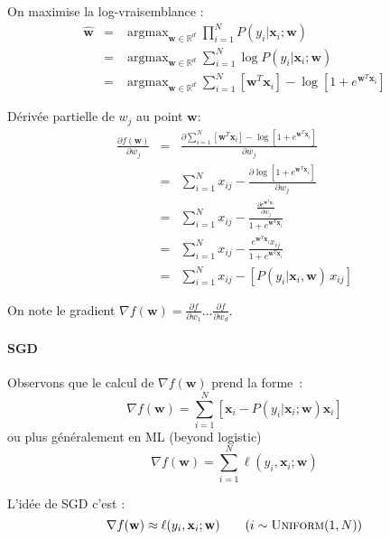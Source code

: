 \documentclass[11pt,openany]{book}
\begin{document}
On maximise la log-vraisemblance :
\begin{eqnarray}
\hat{\mathbf{w}} &=& \mathop{\text{argmax}}_{\mathbf{w} \in
  \mathbb{R}^d} \prod_{i=1}^N P(y_i|\mathbf{x}_i; \mathbf{w})\\
&=&\mathop{\text{argmax}}_{\mathbf{w} \in  \mathbb{R}^d} \sum_{i=1}^N
\log P(y_i|\mathbf{x}_i; \mathbf{w})\\
&=&\mathop{\text{argmax}}_{\mathbf{w} \in  \mathbb{R}^d} \sum_{i=1}^N
 [ \mathbf{w}^T \mathbf{x}_i ] - \log [ 1+e^{\mathbf{w}^T
  \mathbf{x}_i} ]
\end{eqnarray}

Dérivée partielle de $w_j$ au point $\mathbf{w}$:
\begin{eqnarray}
\frac{\partial f(\mathbf{w})}{\partial w_j}&=&\frac{\partial \sum_{i=1}^N
 [ \mathbf{w}^T \mathbf{x}_i ] - \log [ 1+e^{\mathbf{w}^T
  \mathbf{x}_i} ]}{\partial w_j}\\
&=&\sum_{i=1}^N x_{ij} - \frac{\partial \log [ 1+e^{\mathbf{w}^T
  \mathbf{x}_i} ] }{\partial w_j}\\
&=&\sum_{i=1}^N x_{ij} - 
\frac{\frac{\partial e^{\mathbf{w}^T  \mathbf{x}_i} }{\partial
    w_j}}{1+ e^{\mathbf{w}^T  \mathbf{x}_i}}\\
&=&\sum_{i=1}^N x_{ij} - 
\frac{e^{\mathbf{w}^T  \mathbf{x}_i} x_{ij}} {1+ e^{\mathbf{w}^T  \mathbf{x}_i}}\\
&=&\sum_{i=1}^N x_{ij} - [ P(y_i | \mathbf{x}_i,\mathbf{w}) \, x_{ij} ]
\end{eqnarray}

On note le gradient $\nabla f(\mathbf{w}) = \frac{\partial f}{\partial w_1} \ldots
\frac{\partial f}{\partial w_d}$.

\paragraph{SGD} Observons que le calcul de $\nabla f(\mathbf{w})$ prend la forme~:
\begin{displaymath}
\nabla f(\mathbf{w}) = \sum_{i=1}^N [ \mathbf{x}_i -
P(y_i|\mathbf{x}_i;\mathbf{w}) \mathbf{x}_i ]
\end{displaymath} 
ou plus généralement en ML (beyond logistic)
\begin{displaymath}
\nabla f(\mathbf{w}) = \sum_{i=1}^N \ell(y_i,\mathbf{x}_i; \mathbf{w})
\end{displaymath} 

L'idée de SGD c'est :
\begin{displaymath}
\nabla f(\mathbf{w}) \approx \ell(y_i,\mathbf{x}_i; \mathbf{w}) \qquad
({i \sim \text{\sc Uniform}(1,N)})
\end{displaymath} 
\end{document}
